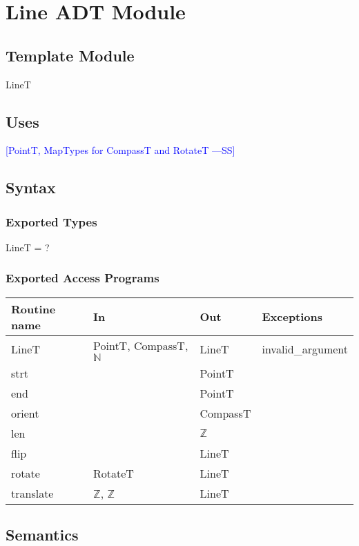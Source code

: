 \documentclass[12pt]{article}
\newcommand{\authornote}[3]{\textcolor{#1}{[#3 ---#2]}}
\newcommand{\authornote}[3]{}
\newcommand{\wss}[1]{\authornote{blue}{SS}{#1}}
\begin{document}
\newpage

\section* {Line ADT Module}

\subsection*{Template Module}

LineT

\subsection* {Uses}

\wss{PointT, MapTypes for CompassT and RotateT}

\subsection* {Syntax}

\subsubsection* {Exported Types}

LineT = ?

\subsubsection* {Exported Access Programs}

\begin{tabular}{| l | l | l | l |}
\hline
\textbf{Routine name} & \textbf{In} & \textbf{Out} & \textbf{Exceptions}\\
\hline
LineT & PointT, CompassT, $\mathbb{N}$ & LineT & invalid\_argument\\
\hline
strt & ~ & PointT & ~\\
\hline
end & ~ & PointT & ~\\
\hline
orient & ~ & CompassT & ~\\
\hline
 len & ~ & $\mathbb{Z}$ & ~\\
\hline
flip & ~ & LineT & ~\\
\hline
rotate & RotateT & LineT & ~\\
\hline
translate & $\mathbb{Z}$, $\mathbb{Z}$ & LineT  & ~\\
\hline
\end{tabular}

\subsection* {Semantics}
\end{document}
